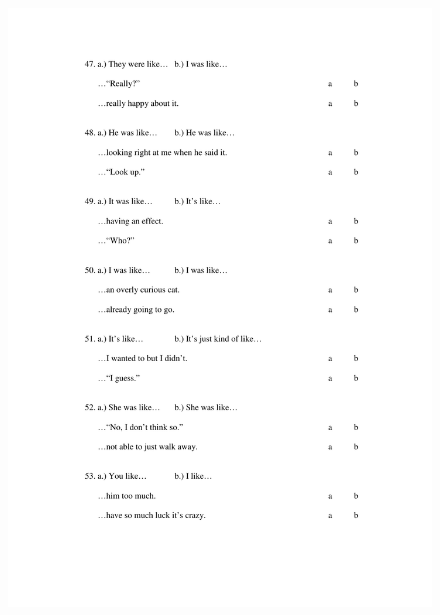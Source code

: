 \begin{figure}[htbp]
	\centering
		\includegraphics[width=5in]{images/Exp1page8.pdf}
		\label{x1p8}
\end{figure}

